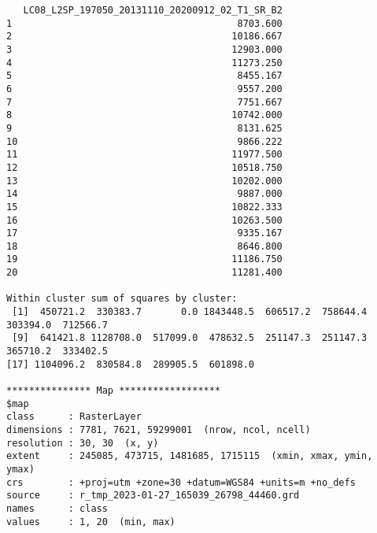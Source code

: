 \begin{scriptsize}
\begin{verbatim}
   LC08_L2SP_197050_20131110_20200912_02_T1_SR_B2
1                                        8703.600
2                                       10186.667
3                                       12903.000
4                                       11273.250
5                                        8455.167
6                                        9557.200
7                                        7751.667
8                                       10742.000
9                                        8131.625
10                                       9866.222
11                                      11977.500
12                                      10518.750
13                                      10202.000
14                                       9887.000
15                                      10822.333
16                                      10263.500
17                                       9335.167
18                                       8646.800
19                                      11186.750
20                                      11281.400

Within cluster sum of squares by cluster:
 [1]  450721.2  330383.7       0.0 1843448.5  606517.2  758644.4  303394.0  712566.7
 [9]  641421.8 1128708.0  517099.0  478632.5  251147.3  251147.3  365710.2  333402.5
[17] 1104096.2  830584.8  289905.5  601898.0

*************** Map ******************
$map
class      : RasterLayer 
dimensions : 7781, 7621, 59299001  (nrow, ncol, ncell)
resolution : 30, 30  (x, y)
extent     : 245085, 473715, 1481685, 1715115  (xmin, xmax, ymin, ymax)
crs        : +proj=utm +zone=30 +datum=WGS84 +units=m +no_defs 
source     : r_tmp_2023-01-27_165039_26798_44460.grd 
names      : class 
values     : 1, 20  (min, max)
\end{verbatim}
\end{scriptsize}